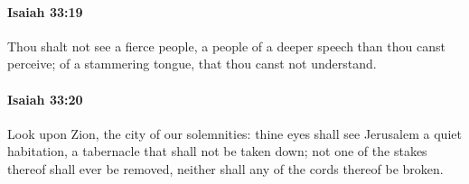 		\paragraph{Isaiah 33:19} %
			\label{ISAIAH-33-19}

			Thou shalt not see a fierce people, a people of a deeper speech than thou canst perceive; of a stammering tongue, that thou canst not understand.


		\paragraph{Isaiah 33:20} %
			\label{ISAIAH-33-20}

			Look upon Zion, the city of our solemnities: thine eyes shall see Jerusalem a quiet habitation, a tabernacle that shall not be taken down; not one of the stakes thereof shall ever be removed, neither shall any of the cords thereof be broken.

